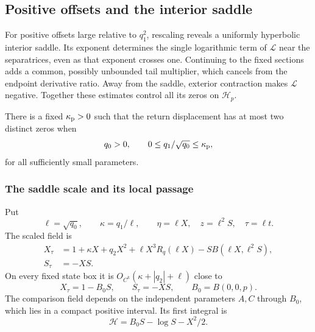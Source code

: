 \subsection{Positive offsets and the interior saddle}
\label{sec:direct-positive-offset}

For positive offsets large relative to \(q_1^2\), rescaling reveals
a uniformly hyperbolic interior saddle. Its exponent determines the
single logarithmic term of \(\mathcal L\) near the separatrices, even
as that exponent crosses one. Continuing to the fixed sections adds
a common, possibly unbounded tail multiplier, which cancels from the
endpoint derivative ratio. Away from the saddle, exterior contraction
makes \(\mathcal L\) negative. Together these estimates control all
its zeros on \(\mathcal H_p\).

\begin{proposition}
\label{prop:direct-positive-offset}
There is a fixed \(\kappa_{\rm p}>0\) such that the return displacement
has at most two distinct zeros when
\[
 q_0>0,\qquad 0\le q_1/\sqrt{q_0}\le\kappa_{\rm p},
\]
for all sufficiently small parameters.
\end{proposition}

\subsubsection{The saddle scale and its local passage}

Put
\[
 \ell=\sqrt{q_0},\qquad \kappa=q_1/\ell,\qquad
 \eta=\ell X,\quad z=\ell^2S,\quad \tau=\ell t .
\]
The scaled field is
\begin{equation}
\label{eq:direct-positive-scaled-field}
 \begin{aligned}
 X_\tau&=1+\kappa X+q_2X^2+\ell X^3R_q(\ell X)
              -SB(\ell X,\ell^2S),\\
 S_\tau&=-XS.
 \end{aligned}
\end{equation}
On every fixed state box it is
\(O_{C^k}(\kappa+|q_2|+\ell)\) close to
\begin{equation}
\label{eq:direct-positive-comparison}
 X_\tau=1-B_0S,\qquad S_\tau=-XS,\qquad B_0=B(0,0,p).
\end{equation}
The comparison field depends on the independent parameters \(A,C\)
through \(B_0\), which lies in a compact positive interval. Its first
integral is
\begin{equation}
\label{eq:direct-positive-first-integral}
 \mathscr H=B_0S-\log S-X^2/2 .
\end{equation}

